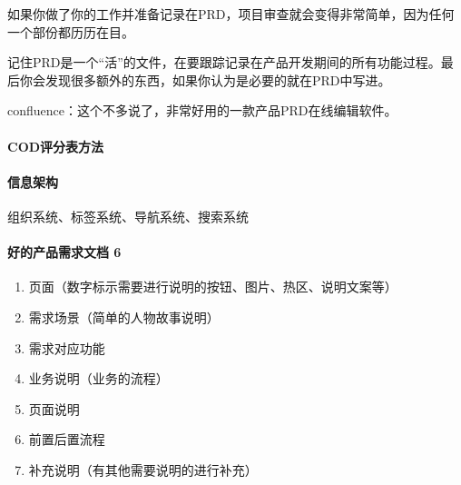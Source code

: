 \documentclass[letterpaper,11pt,english]{sphinxmanual}
\begin{document}
如果你做了你的工作并准备记录在PRD，项目审查就会变得非常简单，因为任何一个部份都历历在目。

记住PRD是一个“活”的文件，在要跟踪记录在产品开发期间的所有功能过程。最后你会发现很多额外的东西，如果你认为是必要的就在PRD中写进。

confluence：这个不多说了，非常好用的一款产品PRD在线编辑软件。%
\begin{footnote}[498]\sphinxAtStartFootnote
{}
%
\end{footnote}


\paragraph{COD评分表方法}
\label{\detokenize{chapter_knowledge/PRD:cod}}

\paragraph{信息架构}
\label{\detokenize{chapter_knowledge/PRD:id27}}
组织系统、标签系统、导航系统、搜索系统


\paragraph{好的产品需求文档 6\sphinxfootnotemark[499]}
\label{\detokenize{chapter_knowledge/PRD:id28}}%
\begin{footnotetext}[499]\sphinxAtStartFootnote
{}
%
\end{footnotetext}\ignorespaces \begin{enumerate}
%
\item {} 
页面（数字标示需要进行说明的按钮、图片、热区、说明文案等）

\item {} 
需求场景（简单的人物故事说明）

\item {} 
需求对应功能

\item {} 
业务说明（业务的流程）

\item {} 
页面说明

\item {} 
前置后置流程

\item {} 
补充说明（有其他需要说明的进行补充）

\end{enumerate}
\end{document}
